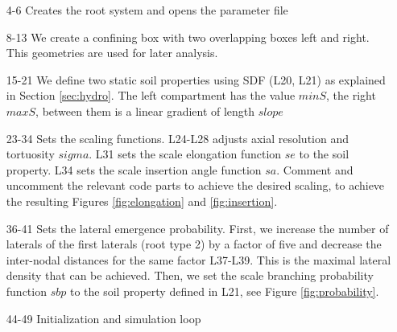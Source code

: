 \documentclass[a4paper]{article}
\begin{document}
\begin{itemize}

\item[4-6] Creates the root system and opens the parameter file

\item[8-13] We create a confining box with two overlapping boxes left and right. This geometries are used for later analysis.

\item[15-21] We define two static soil properties using SDF (L20, L21) as explained in Section \ref{sec:hydro}. 
The left compartment has the value $minS$, the right $maxS$, between them is a linear gradient of length $slope$

\item[23-34] Sets the scaling functions. L24-L28 adjusts axial resolution and tortuosity $sigma$. L31 sets the scale elongation function $se$ to the soil property. L34 sets the scale insertion angle function $sa$. 
Comment and uncomment the relevant code parts to achieve the desired scaling, to achieve the resulting Figures \ref{fig:elongation} and \ref{fig:insertion}.

\item[36-41] Sets the lateral emergence probability. 
First, we increase the number of laterals of the first laterals (root type 2) by a factor of five and decrease the inter-nodal distances for the same factor L37-L39. This is the maximal lateral density that can be achieved.
Then, we set the scale branching probability function $sbp$ to the soil property defined in L21, see Figure \ref{fig:probability}.

\item[44-49] Initialization and simulation loop


\end{itemize}
\end{document}
